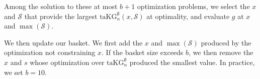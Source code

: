 \documentclass[letterpaper]{article}
\newcommand{\cost}{\text{cost}}
\newcommand{\taKGE}{\text{taKG}^\emptyset}
\numberwithin{equation}{section}
\let\Section\S
\renewcommand{\S}{\mathcal{S}}
\newcommand{\sectn}[1]{\Section\ref{#1}}
\begin{document}
Among the solution to these at most $b+1$ optimization problems, we select the $x$ and $\S$ that provide the largest $\taKGE_n(x,\S)$ at optimality, and evaluate $g$ at $x$ and $\max(\S)$.

We then update our basket.
We first add the $x$ and $\max(\S)$ produced by the optimization not constraining $x$.
If the basket size exceeds $b$, we then remove the $x$ and $s$ whose optimization over $\taKGE_n$ produced the smallest value.
In practice, we set $b=10$.






\end{document}
